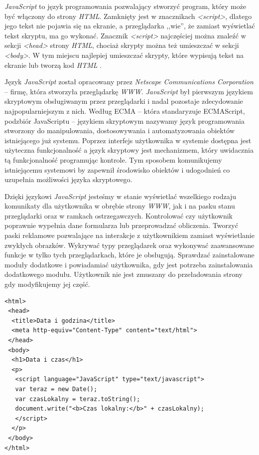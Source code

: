 \documentclass{iiuwb}
\begin{document}
\textit{JavaScript} to język programowania pozwalający stworzyć program, który może być włączony do strony \textit{HTML}. Zamknięty jest w znacznikach \textit{<script>}, dlatego jego tekst nie pojawia się na ekranie, a przeglądarka ,,wie'', że zamiast wyświetlać tekst skryptu, ma go wykonać. Znacznik \textit{<script>} najczęściej można znaleźć w sekcji \textit{<head>} strony \textit{HTML}, chociaż skrypty można też umieszczać w sekcji \textit{<body>}. W tym miejscu najlepiej umieszczać skrypty, które wypisują tekst na ekranie lub tworzą kod \textit{HTML} \cite{Negrino:2007:J}.

Język \textit{JavaScript} został opracowany przez \textit{Netscape Communications Corporation} -- firmę, która stworzyła przeglądarkę \textit{WWW}. \textit{JavaScript} był pierwszym językiem skryptowym obsługiwanym przez przeglądarki i nadal pozostaje zdecydowanie najpopularniejszym z nich. Według ECMA -- która standaryzuje ECMAScript, podzbiór JavaScriptu -- językiem skryptowym nazywamy język programowania stworzony do manipulowania, dostosowywania i automatyzowania obiektów istniejącego już systemu. Poprzez interfejs użytkownika w systemie dostępna jest użyteczna funkcjonalność a język skryptowy jest mechanizmem, który uwidacznia tą funkcjonalność programując kontrole. Tym sposobem komunikujemy istniejącemu systemowi by zapewnił środowisko obiektów i udogodnień co uzupełnia możliwości języka skryptowego.

Dzięki językowi \textit{JavaScript} jesteśmy w stanie wyświetlać wszelkiego rodzaju komunikaty dla użytkownika w obrębie strony \textit{WWW}, jak i na pasku stanu przeglądarki oraz w ramkach ostrzegawczych. Kontrolować czy użytkownik poprawnie wypełnia dane formularza lub przeprowadzać obliczenia. Tworzyć paski reklamowe pozwalające na interakcje z użytkownikiem zamiast wyświetlanie zwykłych obrazków. Wykrywać typy przeglądarek oraz wykonywać zaawansowane funkcje w tylko tych przeglądarkach, które je obsługują. Sprawdzać zainstalowane moduły dodatkowe i powiadamiać użytkownika, gdy jest potrzeba zainstalowania dodatkowego modułu. Użytkownik nie jest zmuszany do przeładowania strony gdy modyfikujemy jej część.

 \begin{lstlisting}[label=Skrypt w JavaScript, caption=Skrypt w JavaScript]
<html>
 <head>
  <title>Data i godzina</title>
  <meta http-equiv="Content-Type" content="text/html">  
 </head>
 <body>
  <h1>Data i czas</h1>
  <p>
   <script language="JavaScript" type="text/javascript">
   var teraz = new Date();
   var czasLokalny = teraz.toString();
   document.write("<b>Czas lokalny:</b>" + czasLokalny);
   </script> 
  </p> 
 </body>
</html>
 \end{lstlisting}
\end{document}
